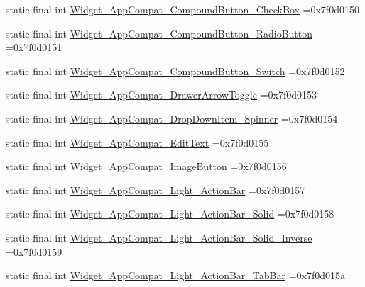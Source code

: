 \begin{DoxyCompactItemize}
\item 
static final int \mbox{\hyperlink{classbr_1_1unb_1_1cic_1_1mp_1_1marketmaster_1_1R_1_1style_aaa3238e2cc706ee86ad6a71ee69bc3bf}{Widget\+\_\+\+App\+Compat\+\_\+\+Compound\+Button\+\_\+\+Check\+Box}} =0x7f0d0150
\item 
static final int \mbox{\hyperlink{classbr_1_1unb_1_1cic_1_1mp_1_1marketmaster_1_1R_1_1style_a14451188128403617f619762baba3128}{Widget\+\_\+\+App\+Compat\+\_\+\+Compound\+Button\+\_\+\+Radio\+Button}} =0x7f0d0151
\item 
static final int \mbox{\hyperlink{classbr_1_1unb_1_1cic_1_1mp_1_1marketmaster_1_1R_1_1style_aace3f3906399d12c421a51b14763842e}{Widget\+\_\+\+App\+Compat\+\_\+\+Compound\+Button\+\_\+\+Switch}} =0x7f0d0152
\item 
static final int \mbox{\hyperlink{classbr_1_1unb_1_1cic_1_1mp_1_1marketmaster_1_1R_1_1style_a7ed247f1c57163c1f0ab2492fad90faa}{Widget\+\_\+\+App\+Compat\+\_\+\+Drawer\+Arrow\+Toggle}} =0x7f0d0153
\item 
static final int \mbox{\hyperlink{classbr_1_1unb_1_1cic_1_1mp_1_1marketmaster_1_1R_1_1style_a765e50a1857c2f223644e86a8f81ec43}{Widget\+\_\+\+App\+Compat\+\_\+\+Drop\+Down\+Item\+\_\+\+Spinner}} =0x7f0d0154
\item 
static final int \mbox{\hyperlink{classbr_1_1unb_1_1cic_1_1mp_1_1marketmaster_1_1R_1_1style_affcc11d01e0cebf7f9f9fa03d3a37f00}{Widget\+\_\+\+App\+Compat\+\_\+\+Edit\+Text}} =0x7f0d0155
\item 
static final int \mbox{\hyperlink{classbr_1_1unb_1_1cic_1_1mp_1_1marketmaster_1_1R_1_1style_ae8b3241a8676b462ad55a15bd25de8f6}{Widget\+\_\+\+App\+Compat\+\_\+\+Image\+Button}} =0x7f0d0156
\item 
static final int \mbox{\hyperlink{classbr_1_1unb_1_1cic_1_1mp_1_1marketmaster_1_1R_1_1style_ab25819c09fdd7c57908bca8fd286163a}{Widget\+\_\+\+App\+Compat\+\_\+\+Light\+\_\+\+Action\+Bar}} =0x7f0d0157
\item 
static final int \mbox{\hyperlink{classbr_1_1unb_1_1cic_1_1mp_1_1marketmaster_1_1R_1_1style_a5876434572a04eabd2cc795004181682}{Widget\+\_\+\+App\+Compat\+\_\+\+Light\+\_\+\+Action\+Bar\+\_\+\+Solid}} =0x7f0d0158
\item 
static final int \mbox{\hyperlink{classbr_1_1unb_1_1cic_1_1mp_1_1marketmaster_1_1R_1_1style_a806ba7876725135a8d8fbf8b9d12d376}{Widget\+\_\+\+App\+Compat\+\_\+\+Light\+\_\+\+Action\+Bar\+\_\+\+Solid\+\_\+\+Inverse}} =0x7f0d0159
\item 
static final int \mbox{\hyperlink{classbr_1_1unb_1_1cic_1_1mp_1_1marketmaster_1_1R_1_1style_a08b5be8bb64441f65185e91e66ba72a0}{Widget\+\_\+\+App\+Compat\+\_\+\+Light\+\_\+\+Action\+Bar\+\_\+\+Tab\+Bar}} =0x7f0d015a

\end{DoxyCompactItemize}
